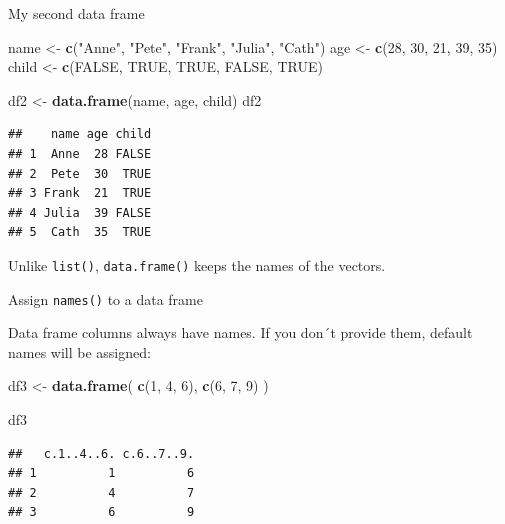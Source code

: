 \documentclass[ignorenonframetext,]{beamer}
\newenvironment{Shaded}{\begin{snugshade}}{\end{snugshade}}
\newcommand{\DecValTok}[1]{\textcolor[rgb]{0.00,0.00,0.81}{#1}}
\newcommand{\KeywordTok}[1]{\textcolor[rgb]{0.13,0.29,0.53}{\textbf{#1}}}
\newcommand{\NormalTok}[1]{#1}
\newcommand{\OtherTok}[1]{\textcolor[rgb]{0.56,0.35,0.01}{#1}}
\newcommand{\StringTok}[1]{\textcolor[rgb]{0.31,0.60,0.02}{#1}}
\begin{document}
\begin{frame}[fragile]{My second data frame}
\protect\hypertarget{my-second-data-frame}{}

\begin{Shaded}
\begin{Highlighting}[]
\NormalTok{name <-}\StringTok{ }\KeywordTok{c}\NormalTok{(}\StringTok{"Anne"}\NormalTok{, }\StringTok{"Pete"}\NormalTok{, }\StringTok{"Frank"}\NormalTok{, }\StringTok{"Julia"}\NormalTok{, }\StringTok{"Cath"}\NormalTok{)}
\NormalTok{age <-}\StringTok{ }\KeywordTok{c}\NormalTok{(}\DecValTok{28}\NormalTok{, }\DecValTok{30}\NormalTok{, }\DecValTok{21}\NormalTok{, }\DecValTok{39}\NormalTok{, }\DecValTok{35}\NormalTok{)}
\NormalTok{child <-}\StringTok{ }\KeywordTok{c}\NormalTok{(}\OtherTok{FALSE}\NormalTok{, }\OtherTok{TRUE}\NormalTok{, }\OtherTok{TRUE}\NormalTok{, }\OtherTok{FALSE}\NormalTok{, }\OtherTok{TRUE}\NormalTok{)}

\NormalTok{df2 <-}\StringTok{ }\KeywordTok{data.frame}\NormalTok{(name, age, child)}
\NormalTok{df2}
\end{Highlighting}
\end{Shaded}

\begin{verbatim}
##    name age child
## 1  Anne  28 FALSE
## 2  Pete  30  TRUE
## 3 Frank  21  TRUE
## 4 Julia  39 FALSE
## 5  Cath  35  TRUE
\end{verbatim}

Unlike \texttt{list()}, \texttt{data.frame()} keeps the names of the
vectors.

\end{frame}

\begin{frame}[fragile]{Assign \texttt{names()} to a data frame}
\protect\hypertarget{assign-names-to-a-data-frame}{}

Data frame columns always have names. If you don´t provide them, default
names will be assigned:

\begin{Shaded}
\begin{Highlighting}[]
\NormalTok{df3 <-}\StringTok{ }\KeywordTok{data.frame}\NormalTok{(}
  \KeywordTok{c}\NormalTok{(}\DecValTok{1}\NormalTok{, }\DecValTok{4}\NormalTok{, }\DecValTok{6}\NormalTok{),}
  \KeywordTok{c}\NormalTok{(}\DecValTok{6}\NormalTok{, }\DecValTok{7}\NormalTok{, }\DecValTok{9}\NormalTok{)}
\NormalTok{) }

\NormalTok{df3}
\end{Highlighting}
\end{Shaded}

\begin{verbatim}
##   c.1..4..6. c.6..7..9.
## 1          1          6
## 2          4          7
## 3          6          9
\end{verbatim}

\end{frame}
\end{document}
